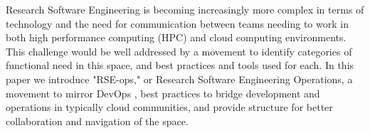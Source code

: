 Research Software Engineering is becoming increasingly more complex in terms of technology and the need for communication between teams needing to work in both high performance computing (HPC) and cloud computing environments. This challenge would be well addressed by a movement to identify categories of functional need in this space, and best practices and tools used for each. In this paper we introduce "RSE-ops," or Research Software Engineering Operations, a movement to mirror DevOps \cite{Atlassian_undated-ka}, best practices to bridge development and operations in typically cloud communities, and provide structure for better collaboration and navigation of the space.
